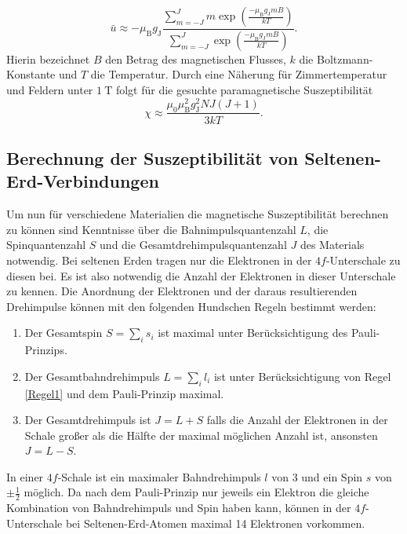 \begin{equation}
	\bar{u}\approx -\mu_\text{B} g_\text{J} \frac{\sum\limits_{m=-J}^{J} m \exp\left(\frac{-\mu_\text{B} g_\text{J} m B}{k T}\right)}{\sum\limits_{m=-J}^{J} \exp\left(\frac{-\mu_\text{B} g_\text{J} m B}{k T}\right)}\text{.}
\end{equation}
Hierin bezeichnet $B$ den Betrag des magnetischen Flusses, $k$ die Boltzmann-Konstante und $T$ die Temperatur.  Durch eine Näherung für Zimmertemperatur und Feldern unter $\SI{1}{\tesla}$ folgt für die gesuchte paramagnetische Suszeptibilität
\begin{equation}
	\chi \approx \frac{\mu_0 \mu_\text{B}^2 g_\text{J}^2 N J(J+1)}{3 k T}\text{.}\label{eq:chitheo}
\end{equation}


\subsection{Berechnung der Suszeptibilität von Seltenen-Erd-Verbindungen}
Um nun für verschiedene Materialien die magnetische Suszeptibilität berechnen zu können sind Kenntnisse über die Bahnimpulsquantenzahl $L$, die Spinquantenzahl $S$ und die Gesamtdrehimpulsquantenzahl $J$ des Materials notwendig. Bei seltenen Erden tragen nur die Elektronen in der $4f$-Unterschale zu diesen bei. Es ist also notwendig die Anzahl der Elektronen in dieser Unterschale zu kennen. Die Anordnung der Elektronen und der daraus resultierenden Drehimpulse können mit den folgenden Hundschen Regeln bestimmt werden:
\begin{enumerate}
	\item Der Gesamtspin $S=\sum\limits_{i} s_i$ ist maximal unter Berücksichtigung des Pauli-Prinzips. \label{Regel1}
	\item Der Gesamtbahndrehimpuls $L=\sum\limits_i l_i$ ist unter Berücksichtigung von Regel \ref{Regel1} und dem Pauli-Prinzip maximal. \label{Regel2}
	\item Der Gesamtdrehimpuls ist $J=L+S$ falls die Anzahl der Elektronen in der Schale großer als die Hälfte der maximal möglichen Anzahl ist, ansonsten $J=L-S$. \label{Regel3}
\end{enumerate}
In einer $4f$-Schale ist ein maximaler Bahndrehimpuls $l$ von 3 und ein Spin $s$ von $\pm \frac{1}{2}$ möglich. Da nach dem Pauli-Prinzip nur jeweils ein Elektron die gleiche Kombination von Bahndrehimpuls und Spin haben kann, können in der $4f$-Unterschale bei Seltenen-Erd-Atomen maximal 14 Elektronen vorkommen.